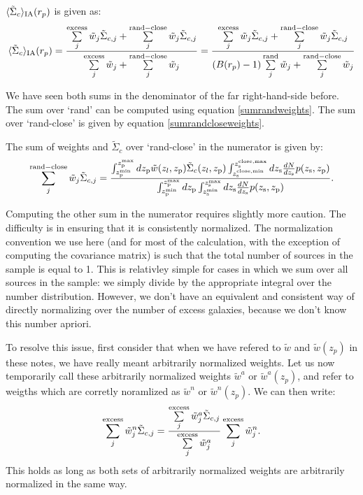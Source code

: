\documentclass[onecolumn,amsmath,aps,fleqn, superscriptaddress]{revtex4}
\begin{document}
$\langle \tilde{\Sigma}_c\rangle_{\rm IA}(r_p)$ is given as:
\begin{equation}
\langle \tilde{\Sigma}_c\rangle_{\rm IA} (r_p) =  \frac{\sum\limits_{j}^{\rm excess} \tilde{w}_j \tilde{\Sigma}_{c,j}+ \sum\limits_{j}^{\rm rand-close} \tilde{w}_j \tilde{\Sigma}_{c,j}}{\sum\limits_{j}^{\rm excess} \tilde{w}_j + \sum\limits_{j}^{\rm rand-close} \tilde{w}_j}= \frac{\sum\limits_{j}^{\rm excess} \tilde{w}_j \tilde{\Sigma}_{c,j}+ \sum\limits_{j}^{\rm rand-close} \tilde{w}_j \tilde{\Sigma}_{c,j}}{(B(r_p)-1)\sum\limits_{j}^{\rm rand} \tilde{w}_j + \sum\limits_{j}^{\rm rand-close} \tilde{w}_j}
\label{SigmaIA}
\end{equation} 

We have seen both sums in the denominator of the far right-hand-side before. The sum over `rand' can be computed using equation \ref{sumrandweights}. The sum over `rand-close' is given by equation \ref{sumrandcloseweights}.

The sum of weights and $\tilde{\Sigma}_{c}$ over `rand-close' in the numerator is given by:
\begin{equation}
\sum\limits_{j}^{\rm rand-close} \tilde{w}_j \tilde{\Sigma}_{c,j} = \frac{\int_{z_{\rm p}^{\rm min}}^{z_{\rm p}^{\rm max}} d z_{\rm p} \tilde{w}(z_l, z_{\rm p})\tilde{\Sigma}_c(z_l, z_{\rm p}) \int_{z_{\rm s}^{\rm close, min}}^{z_{\rm s}^{\rm close, max}} dz_{\rm s} \frac{dN}{dz_{\rm s}} p(z_{\rm s}, z_{\rm p})}{\int_{z_{\rm p}^{\rm min}}^{z_{\rm p}^{\rm max}} d z_{\rm p} \int_{z_{\rm s}^{\rm min}}^{z_{\rm s}^{\rm max}} dz_{\rm s} \frac{dN}{dz_{\rm s}} p(z_{\rm s}, z_{\rm p})}.
\label{sumrandcloseweightsSigC}
\end{equation}

Computing the other sum in the numerator requires slightly more caution. The difficulty is in ensuring that it is consistently normalized. The normalization convention we use here (and for most of the calculation, with the exception of computing the covariance matrix) is such that the total number of sources in the sample is equal to 1. This is relativley simple for cases in which we sum over all sources in the sample: we simply divide by the appropriate integral over the number distribution. However, we don't have an equivalent and consistent way of directly normalizing over the number of excess galaxies, because we don't know this number apriori. 

To resolve this issue, first consider that when we have refered to $\tilde{w}$ and $\tilde{w}(z_p)$ in these notes, we have really meant arbitrarily normalized weights. Let us now temporarily call these arbitrarily normalized weights $\tilde{w}^a$ or $\tilde{w}^a(z_p)$, and refer to weigths which are corretly noramlized as $\tilde{w}^n$ or $\tilde{w}^n(z_p)$. We can then write:
\begin{equation}
\sum\limits_{j}^{\rm excess} \tilde{w}^n_j \tilde{\Sigma}_{c,j} = \frac{\sum\limits_{j}^{\rm excess} \tilde{w}^a_j \tilde{\Sigma}_{c,j}}{ \sum\limits_{j}^{\rm excess} \tilde{w}^a_j} \sum\limits_{j}^{\rm excess} \tilde{w}^n_j.
\label{normSigIA1}
\end{equation}
This holds as long as both sets of arbitrarily normalized weights are arbitrarily normalized in the same way. 
\end{document}
